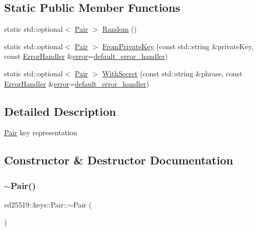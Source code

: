 \subsection*{Static Public Member Functions}
\begin{DoxyCompactItemize}
\item 
static std\+::optional$<$ \mbox{\hyperlink{classed25519_1_1keys_1_1_pair}{Pair}} $>$ \mbox{\hyperlink{classed25519_1_1keys_1_1_pair_a56deb8f1bf6d1a51313abebd5a41d6fc}{Random}} ()
\item 
static std\+::optional$<$ \mbox{\hyperlink{classed25519_1_1keys_1_1_pair}{Pair}} $>$ \mbox{\hyperlink{classed25519_1_1keys_1_1_pair_aa4b34f7823cbba1e4243b9fbf2745e1e}{From\+Private\+Key}} (const std\+::string \&private\+Key, const \mbox{\hyperlink{namespaceed25519_a6ba572942b3c18591fc869d52a6b16e6}{Error\+Handler}} \&\mbox{\hyperlink{namespaceed25519_ac93d0b5156eaca22197055e902920bc4}{error}}=\mbox{\hyperlink{namespaceed25519_a7c7bb6ed17541162959c33ed3e3b15fb}{default\+\_\+error\+\_\+handler}})
\item 
static std\+::optional$<$ \mbox{\hyperlink{classed25519_1_1keys_1_1_pair}{Pair}} $>$ \mbox{\hyperlink{classed25519_1_1keys_1_1_pair_a3d7457b834d7e8091a61272f20132d01}{With\+Secret}} (const std\+::string \&phrase, const \mbox{\hyperlink{namespaceed25519_a6ba572942b3c18591fc869d52a6b16e6}{Error\+Handler}} \&\mbox{\hyperlink{namespaceed25519_ac93d0b5156eaca22197055e902920bc4}{error}}=\mbox{\hyperlink{namespaceed25519_a7c7bb6ed17541162959c33ed3e3b15fb}{default\+\_\+error\+\_\+handler}})
\end{DoxyCompactItemize}


\subsection{Detailed Description}
\mbox{\hyperlink{classed25519_1_1keys_1_1_pair}{Pair}} key representation 

\subsection{Constructor \& Destructor Documentation}
\mbox{\label{classed25519_1_1keys_1_1_pair_a23edc59bc943684eadbdae8ffd6c8a42}} 
\subsubsection{\texorpdfstring{$\sim$Pair()}{~Pair()}}
{\footnotesize\ttfamily ed25519\+::keys\+::\+Pair\+::$\sim$\+Pair (\begin{DoxyParamCaption}{ }\end{DoxyParamCaption})\hspace{0.3cm}{\ttfamily [inline]}}



